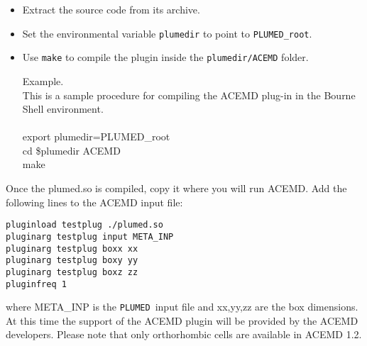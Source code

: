 \documentclass[12pt,fleqn]{report}
\newcommand{\plumed}{{\tt PLUMED}}
\newcommand{\esempio}[1]{
\vspace{10pt}
\begin{flushright}
\colorbox{light-gray}{
   \begin{minipage}{13cm}
       \scriptsize{
{\fontfamily{phv} \fontseries{b}
 \selectfont Example. \\
 \fontseries{m} \selectfont #1 } }
\end{minipage}}
\end{flushright}
\vspace{20pt}
}
\begin{document}
\begin{itemize}
\item Extract the source code from its archive.
\item Set the environmental variable {\tt plumedir} to point to {\tt PLUMED\_root}. 
\item Use {\tt make} to compile the plugin inside the {\tt plumedir/ACEMD} folder. 

\esempio{
This is a sample procedure for compiling the ACEMD plug-in in the Bourne Shell environment.\\ \\

{
export plumedir=PLUMED\_root\\
cd \$plumedir ACEMD \\
make 
}}
\end{itemize}
Once the plumed.so is compiled, copy it where you will run ACEMD.
Add the following lines to the ACEMD input file:
\begin{verbatim}
pluginload testplug ./plumed.so
pluginarg testplug input META_INP
pluginarg testplug boxx xx 
pluginarg testplug boxy yy   
pluginarg testplug boxz zz 
pluginfreq 1
\end{verbatim}

where META\_INP is the \plumed \ input file and xx,yy,zz are the box dimensions.
At this time the support of the ACEMD plugin will be provided by the ACEMD
developers. Please note that only orthorhombic cells are available in ACEMD 1.2.


%


\end{document}
